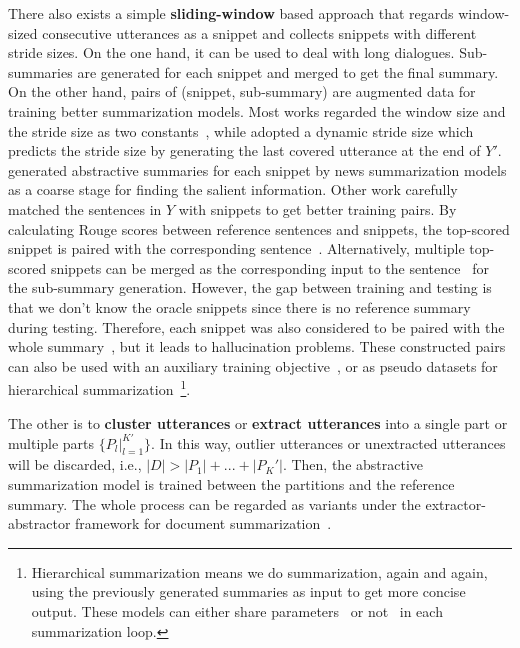 There also exists a simple \textbf{sliding-window} based approach that regards window-sized consecutive utterances as a snippet and collects snippets with different stride sizes.
On the one hand, it can be used to deal with long dialogues. Sub-summaries are generated for each snippet and merged to get the final summary.
On the other hand, pairs of (snippet, sub-summary) are augmented data for training better summarization models.
Most works regarded the window size and the stride size as two constants~\cite{koay2021sliding,liu2021topic,zhang2021leveraging,zhang2021summ},
while \citet{liu2021dynamic} adopted a dynamic stride size which predicts the stride size by generating the last covered utterance at the end of $Y'$.
\citet{koay2021sliding} generated abstractive summaries for each snippet by news summarization models as a coarse stage for finding the salient information.
Other work carefully matched the sentences in $Y$ with snippets to get 
better training pairs.
By calculating Rouge scores between reference sentences and snippets, 
the top-scored snippet is paired with the corresponding sentence~\cite{liu2021topic, zhang2021summ}.
Alternatively, multiple top-scored snippets can be merged as the corresponding input to the sentence~\cite{zhang2021leveraging} for the sub-summary generation. 
However, the gap between training and testing is that we don't know the oracle snippets since there is no reference summary during testing.
Therefore, each snippet was also considered to be paired with the whole summary~\cite{zhang2021leveraging,zhang2021summ}, but it leads to hallucination problems.
These constructed pairs can also be used with an auxiliary training objective~\cite{liu2021topic}, or as pseudo datasets for hierarchical summarization~\footnote{Hierarchical summarization means we do summarization, again and again, using the previously generated summaries as input to get more concise output. These models can either share parameters~\cite{li2021hierarchical} or not~\cite{zhang2021leveraging,zhang2021summ} in each summarization loop.}.



The other is to \textbf{cluster utterances} or \textbf{extract utterances} into a single part or multiple parts $\{P_l|_{l=1}^{K'}\}$. In this way, outlier utterances or unextracted utterances will be discarded, i.e., $|D|>|P_1| + ... + |P_K'|$. Then, the abstractive summarization model is trained between the partitions and the reference summary. The whole process can be regarded as variants under the extractor-abstractor framework for document summarization~\cite{chen2018fast,liu2021keyword}. 

